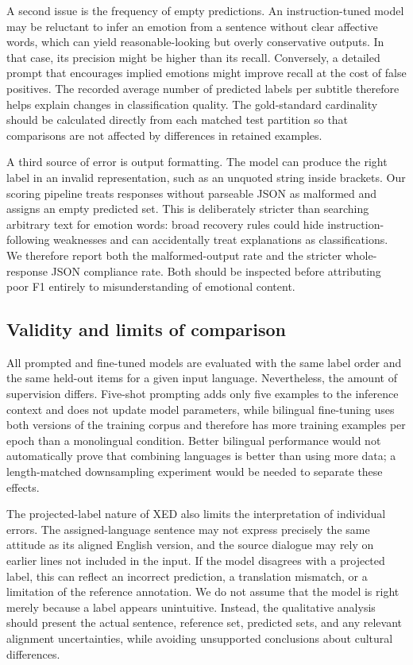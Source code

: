 \documentclass[11pt,a4paper]{article}
\begin{document}
A second issue is the frequency of empty predictions. An instruction-tuned model may be reluctant to infer an emotion from a sentence without clear affective words, which can yield reasonable-looking but overly conservative outputs. In that case, its precision might be higher than its recall. Conversely, a detailed prompt that encourages implied emotions might improve recall at the cost of false positives. The recorded average number of predicted labels per subtitle therefore helps explain changes in classification quality. The gold-standard cardinality should be calculated directly from each matched test partition so that comparisons are not affected by differences in retained examples.

A third source of error is output formatting. The model can produce the right label in an invalid representation, such as an unquoted string inside brackets. Our scoring pipeline treats responses without parseable JSON as malformed and assigns an empty predicted set. This is deliberately stricter than searching arbitrary text for emotion words: broad recovery rules could hide instruction-following weaknesses and can accidentally treat explanations as classifications. We therefore report both the malformed-output rate and the stricter whole-response JSON compliance rate. Both should be inspected before attributing poor F1 entirely to misunderstanding of emotional content.

\subsection*{Validity and limits of comparison}
All prompted and fine-tuned models are evaluated with the same label order and the same held-out items for a given input language. Nevertheless, the amount of supervision differs. Five-shot prompting adds only five examples to the inference context and does not update model parameters, while bilingual fine-tuning uses both versions of the training corpus and therefore has more training examples per epoch than a monolingual condition. Better bilingual performance would not automatically prove that combining languages is better than using more data; a length-matched downsampling experiment would be needed to separate these effects.

The projected-label nature of XED also limits the interpretation of individual errors. The assigned-language sentence may not express precisely the same attitude as its aligned English version, and the source dialogue may rely on earlier lines not included in the input. If the model disagrees with a projected label, this can reflect an incorrect prediction, a translation mismatch, or a limitation of the reference annotation. We do not assume that the model is right merely because a label appears unintuitive. Instead, the qualitative analysis should present the actual sentence, reference set, predicted sets, and any relevant alignment uncertainties, while avoiding unsupported conclusions about cultural differences.
\end{document}

